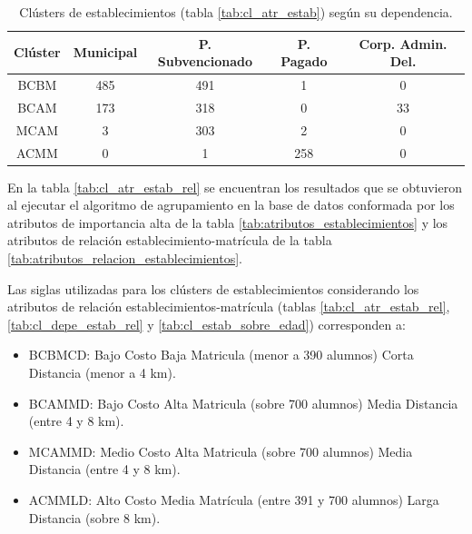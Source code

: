 \begin{table}[H]
\centering
\caption{Clústers de establecimientos (tabla \ref{tab:cl_atr_estab}) según su dependencia.}
\label{tab:cl_depe_estab}
\begin{tabular}{|c|c|c|c|c|}
\hline
\textbf{Clúster} & \textbf{Municipal} & \textbf{P. Subvencionado} & \textbf{P. Pagado} & \textbf{Corp. Admin. Del.}   \\ \hline
BCBM & 485 & 491 & 1 & 0 \\ \hline
BCAM & 173 & 318 & 0 & 33 \\ \hline
MCAM & 3 & 303 & 2 & 0 \\ \hline
ACMM & 0 & 1 & 258 & 0 \\ \hline
\end{tabular}
\end{table}

En la tabla \ref{tab:cl_atr_estab_rel} se encuentran los resultados que se obtuvieron al ejecutar el algoritmo de agrupamiento en la base de datos conformada por los atributos de importancia alta de la tabla \ref{tab:atributos_establecimientos} y los atributos de relación establecimiento-matrícula de la tabla \ref{tab:atributos_relacion_establecimientos}.

Las siglas utilizadas para los clústers de establecimientos considerando los atributos de relación establecimientos-matrícula (tablas \ref{tab:cl_atr_estab_rel}, \ref{tab:cl_depe_estab_rel} y \ref{tab:cl_estab_sobre_edad}) corresponden a:
\begin{itemize}
    \item BCBMCD: Bajo Costo Baja Matricula (menor a 390 alumnos) Corta Distancia (menor a 4 km).
    \item BCAMMD: Bajo Costo Alta Matricula (sobre 700 alumnos) Media Distancia (entre 4 y 8 km).
    \item MCAMMD: Medio Costo Alta Matricula (sobre 700 alumnos) Media Distancia (entre 4 y 8 km).
    \item ACMMLD: Alto Costo Media Matrícula (entre 391 y 700 alumnos) Larga Distancia (sobre 8 km).
\end{itemize}

